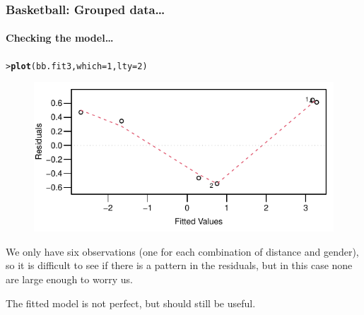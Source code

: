 \documentclass{beamer}\usepackage[]{graphicx}\usepackage[]{xcolor}
\makeatletter
\newcommand{\hlnum}[1]{\textcolor[rgb]{0.686,0.059,0.569}{#1}}%
\newcommand{\hlstd}[1]{\textcolor[rgb]{0.345,0.345,0.345}{#1}}%
\newcommand{\hlkwc}[1]{\textcolor[rgb]{0.333,0.667,0.333}{#1}}%
\newcommand{\hlkwd}[1]{\textcolor[rgb]{0.737,0.353,0.396}{\textbf{#1}}}%
\newenvironment{kframe}{%
 \def\at@end@of@kframe{}%
 \ifinner\ifhmode%
  \def\at@end@of@kframe{\end{minipage}}%
  \begin{minipage}{\columnwidth}%
 \fi\fi%
 \def\FrameCommand##1{\hskip\@totalleftmargin \hskip-\fboxsep
 \colorbox{shadecolor}{##1}\hskip-\fboxsep
     \hskip-\linewidth \hskip-\@totalleftmargin \hskip\columnwidth}%
 \MakeFramed {\advance\hsize-\width
   \@totalleftmargin\z@ \linewidth\hsize
   \@setminipage}}%
 {\par\unskip\endMakeFramed%
 \at@end@of@kframe}
\newenvironment{knitrout}{}{} %
\makeatother
\begin{document}
\begin{frame}[fragile]
\frametitle{Basketball: Grouped data\ldots}
\framesubtitle{Checking the model\ldots}

\begin{knitrout}\scriptsize
{}\color{fgcolor}\begin{kframe}
\begin{alltt}
\hlstd{> }\hlkwd{plot}\hlstd{(bb.fit3,} \hlkwc{which} \hlstd{=} \hlnum{1}\hlstd{,} \hlkwc{lty}\hlstd{=}\hlnum{2}\hlstd{)}
\end{alltt}
\end{kframe}
\end{knitrout}
  
\begin{figure}
  \centering
  \includegraphics{figure/RC-H15-029}
\end{figure}

We only have six observations (one for each combination of distance and gender), so it is difficult to see if there is a pattern in the residuals, but in this case none are large enough to worry us.

The fitted model is not perfect, but should still be useful.
\end{frame}
\end{document}
